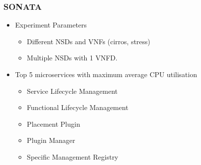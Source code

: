 \begin{frame}
\frametitle{SONATA}
\begin{itemize}
	
	\item Experiment Parameters
	\begin{itemize}
		\item Different NSDs and VNFs (cirros, stress)
		\item Multiple NSDs with 1 VNFD.
	\end{itemize}

	
\end{itemize}


\begin{itemize}
	
	\item Top 5 microservices with maximum average CPU utilisation
	\begin{itemize}
		\item Service Lifecycle Management
		\item Functional Lifecycle Management
		\item Placement Plugin
		\item Plugin Manager
		\item Specific Management Registry
	\end{itemize}
	
	
\end{itemize}
\end{frame}
